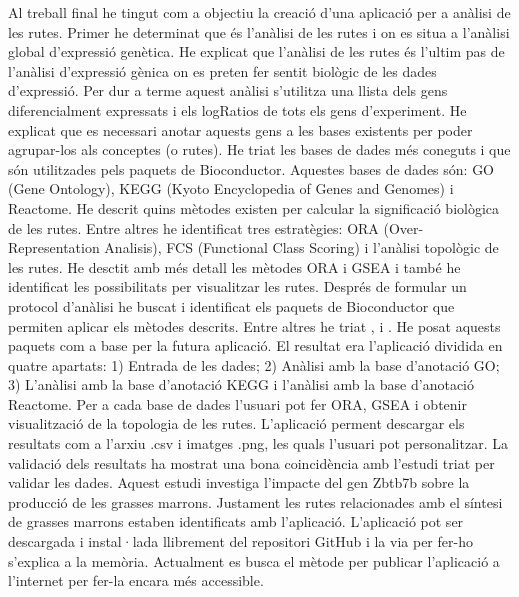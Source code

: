 Al treball final he tingut com a objectiu la creació d'una aplicació per a anàlisi de les rutes. Primer he determinat que és l'anàlisi de les rutes i on es situa a l'anàlisi global d'expressió genètica. He explicat que l'anàlisi de les rutes és l'ultim pas de l'anàlisi d'expressió gènica on es preten fer sentit biològic de les dades d'expressió. Per dur a terme aquest anàlisi s'utilitza una llista dels gens diferencialment expressats i els logRatios de tots els gens d'experiment. He explicat que es necessari anotar aquests gens a les bases existents per poder agrupar-los als conceptes (o rutes). He triat les bases de dades més coneguts i que són utilitzades pels paquets de Bioconductor. Aquestes bases de dades són: GO (Gene Ontology), KEGG (Kyoto Encyclopedia of Genes  and Genomes) i Reactome. He descrit quins mètodes existen per calcular la significació biològica de les rutes. Entre altres he identificat tres estratègies:  ORA (Over-Representation Analisis), FCS (Functional Class Scoring) i l'anàlisi topològic de les rutes. He desctit amb més detall les mètodes ORA i GSEA i també he identificat les possibilitats per visualitzar les rutes.  Després de formular un protocol d'anàlisi he buscat i identificat els paquets de Bioconductor que permiten aplicar els mètodes descrits. Entre altres he triat ,  i . He posat aquests paquets com a base per la futura aplicació. El resultat era l'aplicació dividida en quatre apartats: 1) Entrada de les dades; 2) Anàlisi amb la base d'anotació GO; 3) L'anàlisi amb la base d'anotació KEGG i l'anàlisi amb la base d'anotació Reactome. Per a cada base de dades l'usuari pot fer ORA, GSEA i obtenir visualització de la topologia de les rutes. L'aplicació perment descargar els resultats com a l'arxiu .csv i imatges .png, les quals l'usuari pot personalitzar. La validació dels resultats ha mostrat una bona coincidència amb l'estudi triat per validar les dades.  Aquest estudi investiga l'impacte del gen Zbtb7b sobre la producció de les grasses marrons. Justament les rutes relacionades amb el síntesi de grasses marrons estaben identificats amb l'aplicació. L'aplicació pot ser descargada i instal·lada llibrement del repositori GitHub i la via per fer-ho s'explica a la memòria. Actualment es busca el mètode per publicar l'aplicació a l'internet per fer-la encara més accessible.
 


